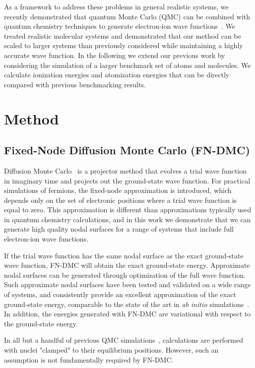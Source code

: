 \documentclass[pra,superscriptaddress,groupedaddress,twocolumn]{revtex4-1}
\begin{document}
As a framework to address these problems in general realistic systems, we recently demonstrated that quantum Monte Carlo (QMC) can be combined with quantum chemistry techniques to generate electron-ion wave functions~\cite{Tubman_ECG}. We treated realistic molecular systems and demonstrated that our method can be scaled to larger systems than previously considered while maintaining a highly accurate wave function. In the following we extend our previous work by considering the simulation of a larger benchmark set of atoms and molecules.  We calculate ionization energies and atomization energies that can be directly compared with previous benchmarking results.

\section{Method}
\subsection{Fixed-Node Diffusion Monte Carlo (FN-DMC)}
Diffusion Monte Carlo~\cite{Anderson_DMC,lester1,Stuart_Review,Needs_Review,Needs_Old_Review,QMC_Review} is a projector method that evolves a trial wave function in imaginary time and projects out the ground-state wave function. For practical simulations of fermions, the fixed-node approximation is introduced, which depends only on the set of electronic positions where a trial wave function is equal to zero.  This approximation is different than approximations typically used in quantum chemistry calculations, and in this work we demonstrate that we can generate high quality nodal surfaces for a range of systems that include full electron-ion wave functions. 

If the trial wave function has the same nodal surface as the exact ground-state wave function, FN-DMC will obtain the exact ground-state energy.  Approximate nodal surfaces can be generated through optimization of the full wave function. Such approximate nodal surfaces have been tested and validated on a wide range of systems, and consistently provide an excellent approximation of the exact ground-state energy, comparable to the state of the art in \textit{ab initio} simulations~\cite{grossman1}. In addition, the energies generated with FN-DMC are variational with respect to the ground-state energy.

In all but a handful of previous QMC simulations~\cite{Ceperley_1987,Natoli_1993,Natoli_1995,Chen_1995,Coldwell_H2_2008,Gabriele_H2_2004,Sandro_finiteT-noBO_2012}, calculations are performed with nuclei "clamped" to their equilibrium positions. However, such an assumption is not fundamentally required by FN-DMC. %
\end{document}
